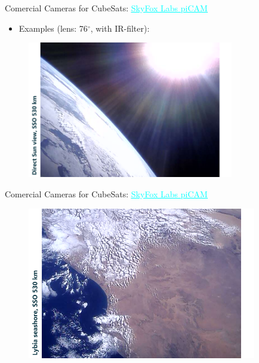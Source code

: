 
\begin{frame}{Comercial Cameras for CubeSats: \href{https://www.skyfoxlabs.com/product/27-digital-cubesat-camera}{\textcolor{cyan}{\underline{SkyFox Labs piCAM}}}}

    \begin{itemize}
        \item Examples (lens: 76$^{\circ}$, with IR-filter):
    \end{itemize}
    \begin{figure}[!ht]
        \begin{center}
            \includegraphics[width=9cm]{figures/picam-ex1}
        \end{center}
    \end{figure}

\end{frame}

\begin{frame}{Comercial Cameras for CubeSats: \href{https://www.skyfoxlabs.com/product/27-digital-cubesat-camera}{\textcolor{cyan}{\underline{SkyFox Labs piCAM}}}}

    \begin{figure}[!ht]
        \begin{center}
            \includegraphics[width=10cm]{figures/picam-ex2}
        \end{center}
    \end{figure}

\end{frame}

